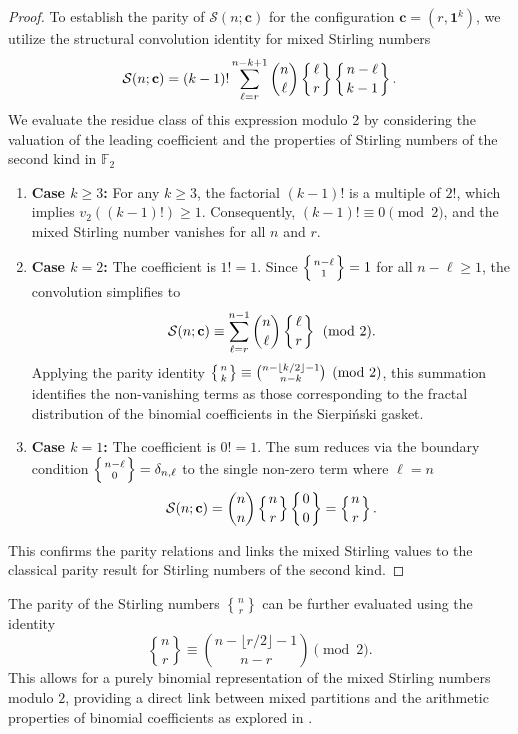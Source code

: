 \documentclass[12pt]{amsart}
\theoremstyle{definition}
\begin{document}
\begin{proof}
To establish the parity of $\mathcal{S}(n; \mathbf{c})$ for the configuration $\mathbf{c} = (r, \mathbf{1}^k)$, we utilize the structural convolution identity for mixed Stirling numbers
\begin{equation}
    \label{eq:detailed_conv}
    \mathcal{S}(n; \mathbf{c}) = (k-1)! \sum_{\ell=r}^{n-k+1} \binom{n}{\ell} \left\{ \genfrac{}{}{0pt}{}{\ell}{r} \right\} \left\{ \genfrac{}{}{0pt}{}{n-\ell}{k-1} \right\}.
\end{equation}
We evaluate the residue class of this expression modulo 2 by considering the valuation of the leading coefficient and the properties of Stirling numbers of the second kind in $\mathbb{F}_2$

\begin{enumerate}
    \item \textbf{Case $k \geq 3$:} For any $k \ge 3$, the factorial $(k-1)!$ is a multiple of $2!$, which implies $v_2((k-1)!) \ge 1$. Consequently, $(k-1)! \equiv 0 \pmod{2}$, and the mixed Stirling number vanishes for all $n$ and $r$.
    
    \item \textbf{Case $k = 2$:} The coefficient is $1! = 1$. Since $\left\{ \genfrac{}{}{0pt}{}{n-\ell}{1} \right\} = 1$ for all $n-\ell \ge 1$, the convolution simplifies to
    \begin{equation*}
        \mathcal{S}(n; \mathbf{c}) \equiv \sum_{\ell=r}^{n-1} \binom{n}{\ell} \left\{ \genfrac{}{}{0pt}{}{\ell}{r} \right\} \pmod{2}.
    \end{equation*}
    Applying the parity identity $\left\{ \genfrac{}{}{0pt}{}{n}{k} \right\} \equiv \binom{n-\lfloor k/2 \rfloor -1}{n-k} \pmod 2$, this summation identifies the non-vanishing terms as those corresponding to the fractal distribution of the binomial coefficients in the Sierpiński gasket.
    
    \item \textbf{Case $k = 1$:} The coefficient is $0! = 1$. The sum reduces via the boundary condition $\left\{ \genfrac{}{}{0pt}{}{n-\ell}{0} \right\} = \delta_{n,\ell}$ to the single non-zero term where $\ell = n$
    \begin{equation*}
        \mathcal{S}(n; \mathbf{c}) = \binom{n}{n} \left\{ \genfrac{}{}{0pt}{}{n}{r} \right\} \left\{ \genfrac{}{}{0pt}{}{0}{0} \right\} = \left\{ \genfrac{}{}{0pt}{}{n}{r} \right\}.
    \end{equation*}
\end{enumerate}
This confirms the parity relations and links the mixed Stirling values to the classical parity result for Stirling numbers of the second kind.
\end{proof}
The parity of the Stirling numbers ${n \brace r}$ can be further evaluated using the identity
\begin{equation}
    {n \brace r} \equiv \binom{n - \lfloor r/2 \rfloor - 1}{n - r} \pmod{2}.
\end{equation}
This allows for a purely binomial representation of the mixed Stirling numbers modulo $2$, providing a direct link between mixed partitions and the arithmetic properties of binomial coefficients as explored in \cite{Yaqubi2016}.
\end{document}
